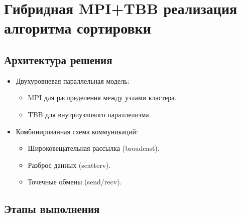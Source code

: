 \documentclass[a4paper,14pt]{extarticle}
\begin{document}
\newpage

\section*{Гибридная MPI+TBB реализация алгоритма сортировки}

\subsection*{Архитектура решения}
\begin{itemize}[leftmargin=*]
    \item Двухуровневая параллельная модель:
    \begin{itemize}
        \item MPI для распределения между узлами кластера.
        \item TBB для внутриузлового параллелизма.
    \end{itemize}
    \item Комбинированная схема коммуникаций:
    \begin{itemize}
        \item Широковещательная рассылка (broadcast).
        \item Разброс данных (scatterv).
        \item Точечные обмены (send/recv).
    \end{itemize}
\end{itemize}

\subsection*{Этапы выполнения}
\end{document}
